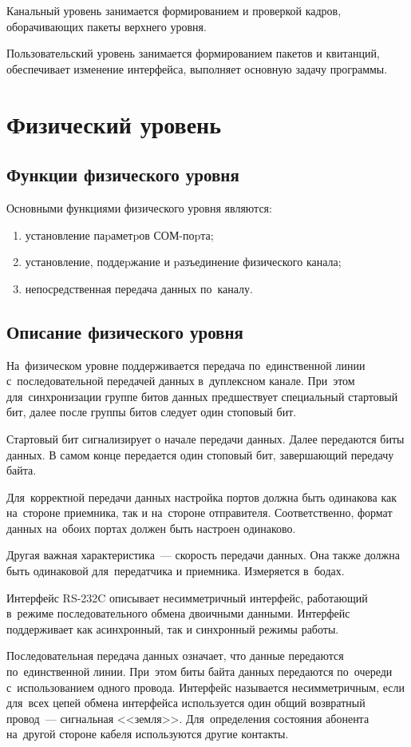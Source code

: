 \documentclass[a4paper,12pt]{article}
\begin{document}
Канальный уровень занимается формированием и проверкой кадров, оборачивающих пакеты верхнего уровня.

Пользовательский уровень занимается формированием пакетов и квитанций, обеспечивает изменение интерфейса, выполняет основную задачу программы.

\section{Физический уровень}
\subsection{Функции физического уровня}
Основными функциями физического уровня являются:
\begin{enumerate}
\item установление паpаметpов СОМ-поpта;
\item установление, поддеpжание и pазъединение физического канала;
\item непосредственная передача данных по~каналу.
\end{enumerate}

\subsection{Описание физического уровня}
На~физическом уровне поддерживается передача по~единственной линии с~последовательной передачей данных в~дуплексном канале. При~этом для~синхронизации группе битов данных предшествует специальный стартовый бит, далее после группы битов следует один стоповый бит.

Стартовый бит сигнализирует о начале передачи данных. Далее передаются биты данных. В самом конце передается один стоповый бит, завершающий передачу байта.

Для~корректной передачи данных настройка портов должна быть одинакова как на~стороне приемника, так и на~стороне отправителя. Соответственно, формат данных на~обоих портах должен быть настроен одинаково.

Другая важная характеристика~--- скорость передачи данных. Она также должна быть одинаковой для~передатчика и приемника. Измеряется в~бодах.

Интерфейс RS-232C описывает несимметричный интерфейс, работающий в~режиме последовательного обмена двоичными данными. Интерфейс поддерживает как асинхронный, так и синхронный режимы работы.

Последовательная передача данных означает, что данные передаются по~единственной линии. При~этом биты байта данных передаются по~очереди с~использованием одного провода. Интерфейс называется несимметричным, если для~всех цепей обмена интерфейса используется один общий возвратный провод~--- сигнальная <<земля>>.
Для~определения состояния абонента на~другой стороне кабеля используются другие контакты.
\end{document}
